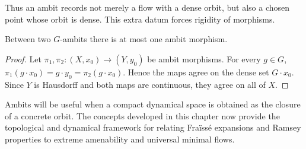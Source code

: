 Thus an ambit records not merely a flow with a dense orbit, but also a chosen
point whose orbit is dense.  This extra datum forces rigidity of morphisms.

\begin{proposition}
    \label{prop:ambit-hom-unique}
    Between two \(G\)-ambits there is at most one ambit morphism.
\end{proposition}

\begin{proof}
    Let \(\pi_1,\pi_2\colon(X,x_0)\to(Y,y_0)\) be ambit morphisms.  For every
    \(g\in G\),
    \(\pi_1(g\cdot x_0)=g\cdot y_0=\pi_2(g\cdot x_0)\).  Hence the maps agree
    on the dense set \(G\cdot x_0\).  Since \(Y\) is Hausdorff and both maps
    are continuous, they agree on all of \(X\).
\end{proof}

Ambits will be useful when a compact dynamical space is obtained as the closure
of a concrete orbit.  The concepts developed in this chapter now provide the
topological and dynamical framework for relating Fraïssé expansions and
Ramsey properties to extreme amenability and universal minimal flows.
